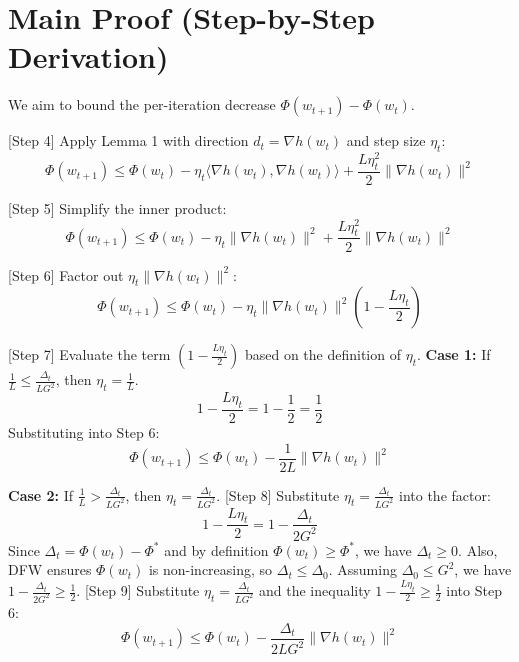 \documentclass{article}
\begin{document}
\section*{Main Proof (Step-by-Step Derivation)}
We aim to bound the per-iteration decrease $\Phi(w_{t+1}) - \Phi(w_t)$.

[Step 4] Apply Lemma 1 with direction $d_t = \nabla h(w_t)$ and step size $\eta_t$:
\begin{equation}
    \Phi(w_{t+1}) \leq \Phi(w_t) - \eta_t \langle \nabla h(w_t), \nabla h(w_t) \rangle + \frac{L\eta_t^2}{2}\|\nabla h(w_t)\|^2
\end{equation}

[Step 5] Simplify the inner product:
\begin{equation}
    \Phi(w_{t+1}) \leq \Phi(w_t) - \eta_t \|\nabla h(w_t)\|^2 + \frac{L\eta_t^2}{2}\|\nabla h(w_t)\|^2
\end{equation}

[Step 6] Factor out $\eta_t \|\nabla h(w_t)\|^2$:
\begin{equation}
    \Phi(w_{t+1}) \leq \Phi(w_t) - \eta_t \|\nabla h(w_t)\|^2 \left(1 - \frac{L\eta_t}{2}\right)
\end{equation}

[Step 7] Evaluate the term $\left(1 - \frac{L\eta_t}{2}\right)$ based on the definition of $\eta_t$.
\textbf{Case 1:} If $\frac{1}{L} \leq \frac{\Delta_t}{L G^2}$, then $\eta_t = \frac{1}{L}$.
\begin{equation}
    1 - \frac{L\eta_t}{2} = 1 - \frac{1}{2} = \frac{1}{2}
\end{equation}
Substituting into Step 6:
\begin{equation}
    \Phi(w_{t+1}) \leq \Phi(w_t) - \frac{1}{2L} \|\nabla h(w_t)\|^2
\end{equation}

\textbf{Case 2:} If $\frac{1}{L} > \frac{\Delta_t}{L G^2}$, then $\eta_t = \frac{\Delta_t}{L G^2}$.
[Step 8] Substitute $\eta_t = \frac{\Delta_t}{L G^2}$ into the factor:
\begin{equation}
    1 - \frac{L\eta_t}{2} = 1 - \frac{\Delta_t}{2 G^2}
\end{equation}
Since $\Delta_t = \Phi(w_t) - \Phi^*$ and by definition $\Phi(w_t) \geq \Phi^*$, we have $\Delta_t \geq 0$. Also, DFW ensures $\Phi(w_t)$ is non-increasing, so $\Delta_t \leq \Delta_0$. Assuming $\Delta_0 \leq G^2$, we have $1 - \frac{\Delta_t}{2G^2} \geq \frac{1}{2}$.
[Step 9] Substitute $\eta_t = \frac{\Delta_t}{L G^2}$ and the inequality $1 - \frac{L\eta_t}{2} \geq \frac{1}{2}$ into Step 6:
\begin{equation}
    \Phi(w_{t+1}) \leq \Phi(w_t) - \frac{\Delta_t}{2 L G^2} \|\nabla h(w_t)\|^2
\end{equation}
\end{document}
